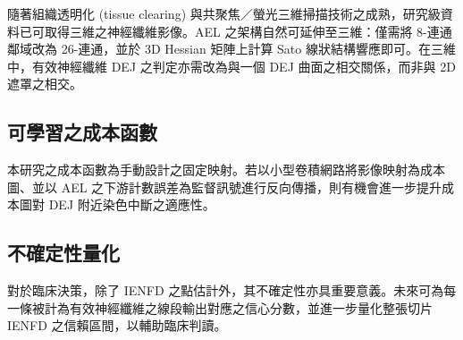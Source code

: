 隨著組織透明化 (tissue clearing) 與共聚焦／螢光三維掃描技術之成熟，研究級資料已可取得三維之神經纖維影像。AEL 之架構自然可延伸至三維：僅需將 8-連通鄰域改為 26-連通，並於 3D Hessian 矩陣上計算 Sato 線狀結構響應即可。在三維中，有效神經纖維 DEJ 之判定亦需改為與一個 DEJ 曲面之相交關係，而非與 2D 遮罩之相交。

\subsection{可學習之成本函數}

本研究之成本函數為手動設計之固定映射。若以小型卷積網路將影像映射為成本圖、並以 AEL 之下游計數誤差為監督訊號進行反向傳播，則有機會進一步提升成本圖對 DEJ 附近染色中斷之適應性。

\subsection{不確定性量化}

對於臨床決策，除了 IENFD 之點估計外，其不確定性亦具重要意義。未來可為每一條被計為有效神經纖維之線段輸出對應之信心分數，並進一步量化整張切片 IENFD 之信賴區間，以輔助臨床判讀。
